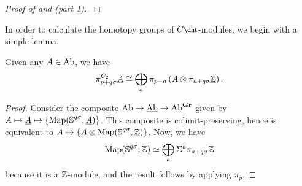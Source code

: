 \begin{proof}[Proof of  and  (part 1).]

\end{proof}

In order to calculate the homotopy groups of $C\ta$-modules, we begin with a simple lemma.

\begin{lem} \label{lem:underline-homotopy}
  Given any $A \in \mathrm{Ab}$, we have
  \[\pi_{p+q\sigma} ^{C_2} \underline{A} \cong \bigoplus_{a} \pi_{p-a} \left(A \otimes \pi_{a+q\sigma} \underline{\mathbb{Z}} \right).\]
\end{lem}

\begin{proof}
  Consider the composite
  $ \mathrm{Ab} \to \underline{\mathrm{Ab}} \to \mathrm{Ab}^{\operatorname{\mathbf{Gr}}} $
  given by
  $ A \mapsto \underline{A} \mapsto \{\operatorname{\mathrm{Map}}(\operatorname{\mathbb{S}}^{q\sigma}, \underline{A})\} $.
  This composite is colimit-preserving, hence is equivalent to
  $ A \mapsto \{A \otimes \operatorname{\mathrm{Map}}(\operatorname{\mathbb{S}}^{q\sigma} , \underline{\mathbb{Z}})\} $.
  Now, we have
  \[\operatorname{\mathrm{Map}}(\operatorname{\mathbb{S}}^{q\sigma} , \underline{\mathbb{Z}}) \simeq \bigoplus_a \Sigma^{a} \pi_{a+q\sigma} \underline{\mathbb{Z}} \]
  because it is a $\mathbb{Z}$-module, and the result follows by applying $\pi_p$.
\end{proof}

